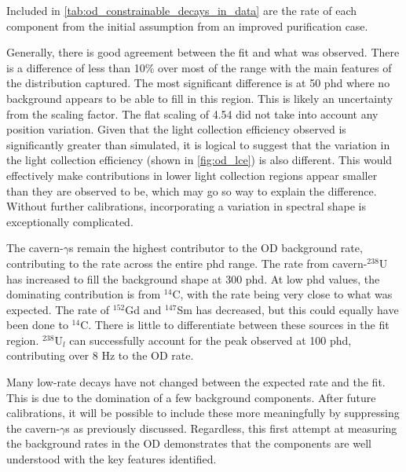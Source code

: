 Included in \autoref{tab:od_constrainable_decays_in_data} are the rate of each component from the initial assumption from an improved purification case.
\par
Generally, there is good agreement between the fit and what was observed.
There is a difference of less than 10\% over most of the range with the main features of the distribution captured.
The most significant difference is at 50 phd where no background appears to be able to fill in this region.
This is likely an uncertainty from the scaling factor.
The flat scaling of 4.54 did not take into account any position variation.
Given that the light collection efficiency observed is significantly greater than simulated, it is logical to suggest that the variation in the light collection efficiency (shown in \autoref{fig:od_lce}) is also different.
This would effectively make contributions in lower light collection regions appear smaller than they are observed to be, which may go so way to explain the difference.
Without further calibrations, incorporating a variation in spectral shape is exceptionally complicated.
\par
The cavern-$\gamma$s remain the highest contributor to the OD background rate, contributing to the rate across the entire phd range.
The rate from cavern-${}^{238}$U has increased to fill the background shape at 300 phd.
At low phd values, the dominating contribution is from ${}^{14}$C, with the rate being very close to what was expected.
The rate of ${}^{152}$Gd and ${}^{147}$Sm has decreased, but this could equally have been done to ${}^{14}$C.
There is little to differentiate between these sources in the fit region.
${}^{238}$U$_l$ can successfully account for the peak observed at 100 phd, contributing over 8 Hz to the OD rate.
\par
Many low-rate decays have not changed between the expected rate and the fit.
This is due to the domination of a few background components.
After future calibrations, it will be possible to include these more meaningfully by suppressing the cavern-$\gamma$s as previously discussed.
Regardless, this first attempt at measuring the background rates in the OD demonstrates that the components are well understood with the key features identified.




